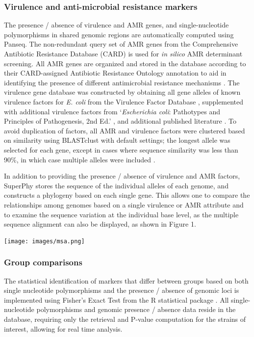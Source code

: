 \documentclass[doublespacing, linenumbers]{bmcart}
\begin{document}
\subsubsection{Virulence and anti-microbial resistance markers}
The presence / absence of virulence and AMR genes, and single-nucleotide polymorphisms in shared genomic regions are automatically computed using Panseq. The non-redundant query set of AMR genes from the Comprehensive Antibiotic Resistance Database (CARD) \cite{mcarthur_comprehensive_2013} is used for \textit{in silico} AMR determinant screening. All AMR genes are organized and stored in the database according to their CARD-assigned Antibiotic Resistance Ontology annotation to aid in identifying the presence of different antimicrobial resistance mechanisms . The virulence gene database was constructed by obtaining all gene alleles of known virulence factors for \textit{E. coli} from the Virulence Factor Database \cite{chen_vfdb_2011}, supplemented with additional virulence factors from `\textit{Escherichia coli}: Pathotypes and Principles of Pathogenesis, 2nd Ed.' , and additional published literature \cite{donnenberg_escherichia_2013}. To avoid duplication of factors, all AMR and virulence factors were clustered based on similarity using BLASTclust with default settings; the longest allele was selected for each gene, except in cases where sequence similarity was less than 90\%, in which case multiple alleles were included \cite{altschul_gapped_1997}.

In addition to providing the presence / absence of virulence and AMR factors, SuperPhy stores the sequence of the individual alleles of each genome, and constructs a phylogeny based on each single gene. This allows one to compare the relationships among genomes based on a single virulence or AMR attribute and to examine the sequence variation at the individual base level, as the multiple sequence alignment can also be displayed, as shown in Figure 1.

 \texttt{[image: images/msa.png]}

\subsubsection{Group comparisons}
The statistical identification of markers that differ between groups based on both single nucleotide polymorphisms and the presence / absence of genomic loci is implemented using Fisher’s Exact Test from the R statistical package \cite{r_foundation_for_statistical_computing_r:_2005}. All single-nucleotide polymorphisms and genomic presence / absence data reside in the database, requiring only the retrieval and P-value computation for the strains of interest, allowing for real time analysis.
\end{document}
